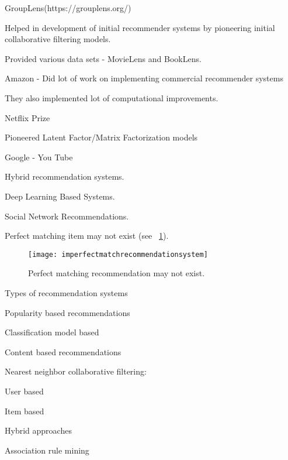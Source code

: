 	\begin{bulletedlist}
		\item GroupLens(https://grouplens.org/)
		\begin{bulletedlist}
			\item Helped in development of initial recommender systems by pioneering initial collaborative filtering models.
			\item Provided various data sets - MovieLens and BookLens.
		\end{bulletedlist}
		\item Amazon - Did lot of work on implementing commercial recommender systems
		\begin{bulletedlist}
			\item They also implemented lot of computational improvements.
		\end{bulletedlist}
		\item Netflix Prize
		\begin{bulletedlist}
			\item Pioneered Latent Factor/Matrix Factorization models
		\end{bulletedlist}
		\item Google - You Tube
		\begin{bulletedlist}
			\item Hybrid recommendation systems.
			\item Deep Learning Based Systems.
		\end{bulletedlist}
		\item Social Network Recommendations.
	\end{bulletedlist}

Perfect matching item may not exist (see \figurename~\ref{fig:imperfectmatchrecommendationsystem}).

	\begin{figure}[tbh]
		\centering
		\texttt{[image: imperfectmatchrecommendationsystem]}
		\caption[Perfect matching recommendation may not exist]{Perfect matching recommendation may not exist.}
		\label{fig:imperfectmatchrecommendationsystem}
	\end{figure}

Types of recommendation systems
	\begin{bulletedlist}
		\item Popularity based recommendations
		\item Classification model based
		\item Content based recommendations
		\item Nearest neighbor collaborative filtering:
		\begin{bulletedlist}
			\item User based
			\item Item based
		\end{bulletedlist}
		\item Hybrid approaches
		\item Association rule mining
	\end{bulletedlist}


